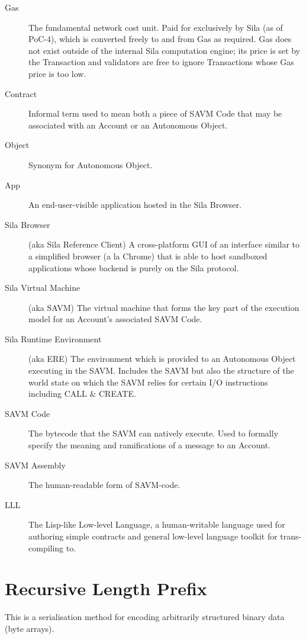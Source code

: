 \documentclass[9pt,oneside]{amsart}
\begin{document}
\begin{description}
\item[Gas] The fundamental network cost unit. Paid for exclusively by Sila (as of PoC-4), which is converted freely to and from Gas as required. Gas does not exist outside of the internal Sila computation engine; its price is set by the Transaction and validators are free to ignore Transactions whose Gas price is too low.

\item[Contract] Informal term used to mean both a piece of SAVM Code that may be associated with an Account or an Autonomous Object.

\item[Object] Synonym for Autonomous Object.

\item[App] An end-user-visible application hosted in the Sila Browser.

\item[Sila Browser] (aka Sila Reference Client) A cross-platform GUI of an interface similar to a simplified browser (a la Chrome) that is able to host sandboxed applications whose backend is purely on the Sila protocol.

\item[Sila Virtual Machine] (aka SAVM) The virtual machine that forms the key part of the execution model for an Account's associated SAVM Code.

\item[Sila Runtime Environment] (aka ERE) The environment which is provided to an Autonomous Object executing in the SAVM. Includes the SAVM but also the structure of the world state on which the SAVM relies for certain I/O instructions including CALL \& CREATE.

\item[SAVM Code] The bytecode that the SAVM can natively execute. Used to formally specify the meaning and ramifications of a message to an Account.

\item[SAVM Assembly] The human-readable form of SAVM-code.

\item[LLL] The Lisp-like Low-level Language, a human-writable language used for authoring simple contracts and general low-level language toolkit for trans-compiling to.

\end{description}

\section{Recursive Length Prefix}\label{app:rlp}\hypertarget{rlp}{}
This is a serialisation method for encoding arbitrarily structured binary data (byte arrays).
\end{document}
